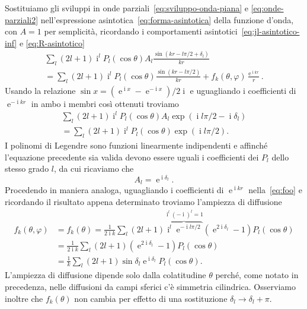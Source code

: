\documentclass[a4paper,fleqn,twoside,12pt]{article}
\renewcommand{\phi}{\varphi}
\DeclareMathOperator{\e}{\mathrm{e}} %
\DeclareMathOperator{\uimm}{\mathrm{i}} %
\begin{document}
Sostituiamo gli sviluppi in onde parziali~\eqref{eq:sviluppo-onda-piana} e
\eqref{eq:onde-parziali2} nell'espressione
asintotica~\eqref{eq:forma-asintotica} della funzione d'onda, con $A = 1$ per
semplicità, ricordando i comportamenti asintotici~\eqref{eq:jl-asintotico-inf} e
\eqref{eq:R-asintotico}
\begin{multline}
  \label{eq:foo}
  \sum_{l}(2l+1)\uimm^{l}P_{l}(\cos\theta)A_{l}\frac{\sin(kr - l\pi/2 +
    \delta_{l})}{kr} \\
  = \sum_{l}(2l+1)\uimm^{l} P_{l}(\cos\theta)\frac{\sin(kr - l\pi/2)}{kr} +
  f_{k}(\theta,\phi)\frac{\e^{\uimm kr}}{r}.
\end{multline}
Usando la relazione $\sin x = (\e^{\uimm x} - \e^{-\uimm x})/2\uimm$ e
uguagliando i coefficienti di $\e^{-\uimm kr}$ in ambo i membri così ottenuti
troviamo
\begin{multline}
  \sum_{l}(2l+1)\uimm^{l}P_{l}(\cos\theta)A_{l}\exp(\uimm l\pi/2 -
  \uimm\delta_{l}) \\
  = \sum_{l}(2l+1)\uimm^{l}P_{l}(\cos\theta)\exp(\uimm l\pi/2).
\end{multline}
I polinomi di Legendre sono funzioni linearmente indipendenti e affinché
l'equazione precedente sia valida devono essere uguali i coefficienti dei
$P_{l}$ dello stesso grado $l$, da cui ricaviamo che
\begin{equation}
  A_{l} = \e^{\uimm \delta_{l}}.
\end{equation}
Procedendo in maniera analoga, uguagliando i coefficienti di $\e^{\uimm kr}$
nella~\eqref{eq:foo} e ricordando il risultato appena determinato troviamo
l'ampiezza di diffusione
\begin{equation}
  \label{eq:ampiezza-diffusione-op}
  \begin{split}
    f_{k}(\theta,\phi) &= f_{k}(\theta) = \frac{1}{2\uimm k}\sum_{l}(2l+1)
    \overbrace{\uimm^{l}\e^{-\uimm l\pi/2}}^{\uimm^{l}(-\uimm)^{l}=1}
    (\e^{2\uimm\delta_{l}} - 1)P_{l}(\cos\theta) \\
    &= \frac{1}{2\uimm k}\sum_{l}(2l+1)(\e^{2\uimm\delta_{l}} - 1)
    P_{l}(\cos\theta) \\
    &= \frac{1}{k} \sum_{l} (2l+1) \sin\delta_{l} \e^{\uimm\delta_{l}}
    P_{l}(\cos\theta).
  \end{split}
\end{equation}
L'ampiezza di diffusione dipende solo dalla colatitudine $\theta$ perché, come
notato in precedenza, nelle diffusioni da campi sferici c'è simmetria
cilindrica.  Osserviamo inoltre che $f_{k}(\theta)$ non cambia per effetto di
una sostituzione $\delta_{l} \to \delta_{l} + \pi$.
\end{document}
